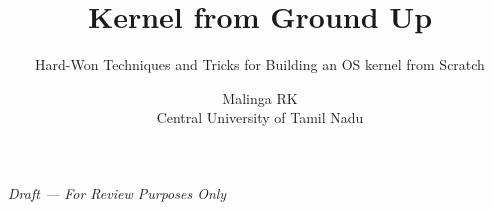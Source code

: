 \documentclass[
  paper=a4,
  fontsize=11pt,
  numbers=noenddot,
]{scrbook}
\title{\fontsize{30}{36}\selectfont Kernel from Ground Up}
\subtitle{Hard-Won Techniques and Tricks for Building an OS kernel from Scratch}
\author{Malinga RK \\ Central University of Tamil Nadu}
\begin{document}
{
  \let\newpage\relax
  \maketitle
  \vspace{2cm}
  \begin{center}
      {\color{red}\itshape\Large Draft --- For Review Purposes Only}
  \end{center}
}

\tableofcontents




\end{document}
